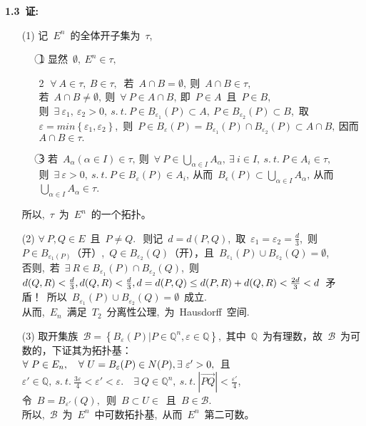 	
	\noindent
	{\textbf{1.3\ 证:}}
	\begin{itemize}
		\item[(1)] 记\ $E^n$\ 的全体开子集为\ $\tau$,
		\begin{itemize}
			\item[\textcircled{1}] 显然\ $\emptyset,\ E^n\in\tau,$
			\item[\textcircled{2}] $\forall\ A\in{\tau},\ B\in \tau ,\ $
			若\ $A\cap B=\emptyset,\ $则\ $A\cap B\in \tau,\ $
			\\
			若\ $A\cap B\neq \emptyset,\ $则\ $\forall\ P\in A\cap B,\ $即\ $P\in A$\ 且\ $P\in B,\ $
			\\
			则\ $\exists\ \varepsilon_1,\ \varepsilon_2 >0,\ s.\ t.\ P\in B_{\varepsilon_1} (P)\subset A,\ P\in B_{\varepsilon_2} (P) \subset B $,\ 取\ $\varepsilon=min {\left\{\varepsilon_1,\varepsilon_2\right\}}$,\ 
			则\ $P\in
			B_\varepsilon(P)=B_{\varepsilon_1}(P)\cap B_{\varepsilon_2}(P)\subset A\cap B,\ $因而\ $A\cap B\in \tau.$
			\item[\textcircled{3}] 若\ $A_\alpha (\alpha\in I)\in \tau, \ $则\ $\forall\ P\in \bigcup\limits_{\alpha\in I} A_\alpha,\ \exists\ i\in I,\ s.\ t.\ P\in A_i\in \tau,\ $
			\\
			则\ $\exists\  \varepsilon>0,\ s.\ t.\ P\in B_\varepsilon (P)\in A_i,\ $从而\ $B_\epsilon (P)\subset\bigcup\limits_{\alpha\in I} A_\alpha,\ $从而\ $\bigcup\limits_{\alpha\in I} A_\alpha\in\tau.\ $
		\end{itemize}
		所以,\ $\tau$\ 为\ $E^n$\ 的一个拓扑。
		\item[(2)] 
		$\forall\ P,Q\in E$\ 且\ $P\neq Q.\ $\ 则记\ $d=d(P,Q)$,\ 取\ $\varepsilon_1=\varepsilon_2=\frac{d}{3}$,\ 则\ $P\in B_{\varepsilon_1(P)}$（开）,\ $Q\in B_{\varepsilon_2}(Q)$（开），且\ $B_{\varepsilon_1}(P)\cup B_{\varepsilon_2}(Q)=\emptyset$,\  
		\\
		否则,\ 若\ $\exists\ R\in B_{\varepsilon_1}(P)\cap B_{\varepsilon_2}(Q)$,\ 则\ $d(Q,R)<\frac{d}{3},d(Q,R)<\frac{d}{3},
		\\
		d=d(P,Q)\leq d(P,R)+d(Q,R)<\frac{2d}{3}<d$\ 矛盾！\ 所以\ $B_{\varepsilon_1}(P)\cup B_{\varepsilon_2}(Q)=\emptyset$\ 成立.
		\\
		从而,\ $E_n$\ 满足\ $T_2$\  分离性公理,\ 为\ Hausdorff\ 空间.
		\item[(3)] 
		取开集族\ $\mathscr{B}=\left\{ B_{\varepsilon}(P)|P\in \mathbb{Q}^n,\varepsilon\in \mathbb{Q} \right\} $,\ 其中\ $\mathbb{Q}$\ 为有理数，故\ $\mathscr{B}$\ 为可数的，下证其为拓扑基：
		\\
		$\forall \ P\in E_n,\quad
		\forall \ U=B_\varepsilon(P) \in N(P),\ 
		\\
		\exists\ \varepsilon'>0,$\ 且\ $\varepsilon'\in \mathbb{Q},\ s.\ t.\ \frac{3\varepsilon}{4}<\varepsilon'<\varepsilon.\quad 
		\exists\ Q \in \mathbb{Q}^n,\ s.\ t.\ \left|\overrightarrow{PQ}\right|<\frac{\varepsilon '}{4}$,
		\\
		令\ $B=B_{\varepsilon'}(Q),$\ 则\ $B\subset U\in $\ 且\ $B\in \mathscr{B}$.
		\\
		所以,\ $\mathscr{B}$\ 为\ $E^n$\ 中可数拓扑基,\ 从而\ $E^n$\ 第二可数。
	\end{itemize}
	
